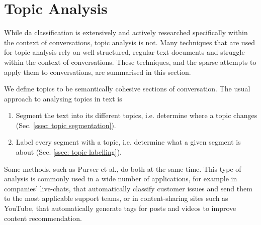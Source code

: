 \section{Topic Analysis \label{sec: topic analysis}}

While \gls{da} classification is extensively and actively researched specifically within the context of conversations, topic analysis is not. Many techniques that are used for topic analysis rely on well-structured, regular text documents and struggle within the context of conversations. These techniques, and the sparse attempts to apply them to conversations, are summarised in this section.

We define topics to be semantically cohesive sections of conversation.
The usual approach to analysing topics in text is
\begin{enumerate}
    \item Segment the text into its different topics, i.e. determine where a topic changes (Sec. \ref{ssec: topic segmentation}).
    \item Label every segment with a topic, i.e. determine what a given segment is about (Sec. \ref{ssec: topic labelling}).
\end{enumerate}
Some methods, such as Purver et al.\cite{purver2006unsupervised}, do both at the same time.
This type of analysis is commonly used in a wide number of applications, for example in companies' live-chats, that automatically classify customer issues and send them to the most applicable support teams, or in content-sharing sites such as YouTube, that automatically generate tags for posts and videos to improve content recommendation\cite{queryClassification}.
